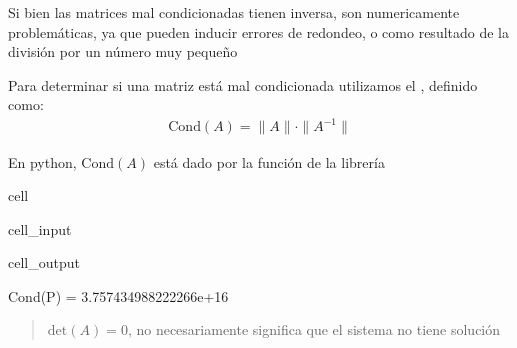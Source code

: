 \documentclass[letterpaper,10pt,english]{jupyterBook}
\begin{document}
\sphinxAtStartPar
Si bien las matrices mal condicionadas tienen inversa, son numericamente problemáticas, ya que pueden inducir errores de redondeo,  o  como resultado de la división por un número muy pequeño

\sphinxAtStartPar
Para determinar si una matriz está mal condicionada utilizamos el , definido como:
\begin{equation*}
\begin{split}\mathrm{Cond}(A) = \|A\|\cdot\|A^{-1}\|\end{split}
\end{equation*}
\sphinxAtStartPar
{}

\sphinxAtStartPar
En python, \(\mathrm{Cond}(A)\) está dado por la función  de la librería 

\begin{sphinxuseclass}{cell}\begin{sphinxVerbatimInput}

\begin{sphinxuseclass}{cell_input}
\begin{sphinxVerbatim}[commandchars=\\\{\}]
   
\end{sphinxVerbatim}

\end{sphinxuseclass}\end{sphinxVerbatimInput}
\begin{sphinxVerbatimOutput}

\begin{sphinxuseclass}{cell_output}
\begin{sphinxVerbatim}[commandchars=\\\{\}]
Cond(P) =  3.757434988222266e+16
\end{sphinxVerbatim}

\end{sphinxuseclass}\end{sphinxVerbatimOutput}

\end{sphinxuseclass}\begin{quote}

\sphinxAtStartPar
\(\mathrm{det}(A)= 0\), no necesariamente significa que el sistema no tiene solución
\end{quote}
\end{document}
